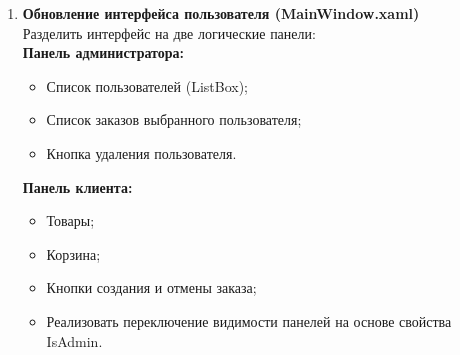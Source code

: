 \documentclass[12pt]{article}
\renewcommand{\texttt}[1]{{\small\ttfamily #1}}
\numberwithin{figure}{section}
\begin{document}
\begin{enumerate}
\begin{enumerate}
		            \texttt{MainViewModel}:
		            \begin{itemize}
			            \item Ввести свойство \texttt{IsAdmin}, определяющее доступность административной панели.
			            \item При наличии административной роли:
			                  \begin{itemize}
				                  \item Загружать список пользователей с заказами (метод \texttt{LoadUsersAsync});
				                  \item Реализовать удаление выбранного пользователя (команда \texttt{DeleteUserCommand});
				                  \item Обновить метод \texttt{LoadOrdersAsync}:
				                        \begin{itemize}
					                        \item Для роли \texttt{Admin} — загружать все заказы;
					                        \item Для роли \texttt{Customer} — только собственные.
				                        \end{itemize}
			                  \end{itemize}
		            \end{itemize}
		      \item \textbf{Обновление интерфейса пользователя (\texttt{MainWindow.xaml})} \\
		            Разделить интерфейс на две логические панели: \\
		            \textbf{Панель администратора:}
		            \begin{itemize}
			            \item Список пользователей (\texttt{ListBox});
			            \item Список заказов выбранного пользователя;
			            \item Кнопка удаления пользователя.
		            \end{itemize}
		            \textbf{Панель клиента:}
		            \begin{itemize}
			            \item Товары;
			            \item Корзина;
			            \item Кнопки создания и отмены заказа;
			            \item Реализовать переключение видимости панелей на основе свойства \texttt{IsAdmin}.
		            \end{itemize}
	      \end{enumerate}
\end{enumerate}
\end{document}
